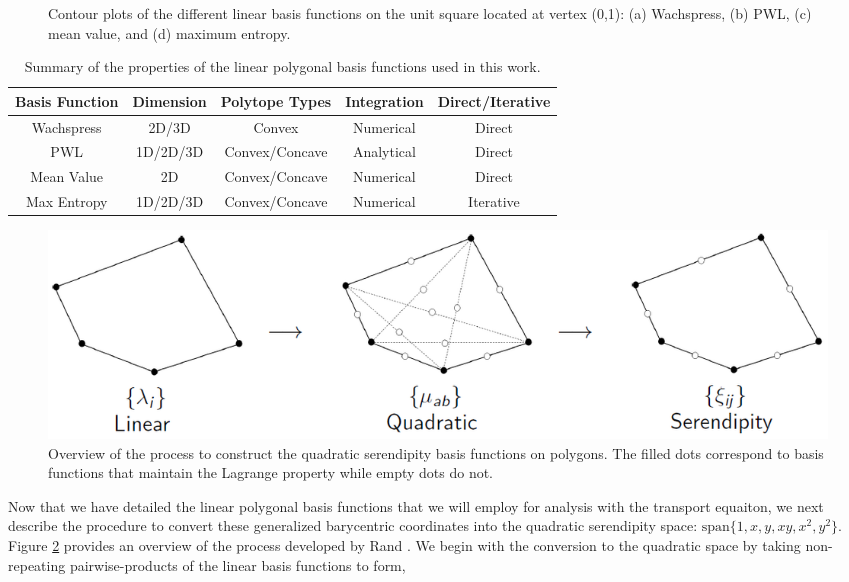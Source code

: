 \documentclass[11pt]{article}
\begin{document}
\begin{figure}
\begin{subfigure}[b]{0.225\textwidth}
		\caption{}
	\end{subfigure}
\caption{Contour plots of the different linear basis functions on the unit square located at vertex (0,1): (a) Wachspress, (b) PWL, (c) mean value, and (d) maximum entropy.}
\label{fig::2D_Linear_Summary_unit_square_basis_functions}
\end{figure}

\begin{table}
\caption{Summary of the properties of the linear polygonal basis functions used in this work.}
\centering
\begin{tabular}{|c|c|c|c|c|}
\hline
Basis Function & Dimension & Polytope Types & Integration & Direct/Iterative \\
\hline \hline
Wachspress	&2D/3D& Convex&	Numerical &Direct\\ \hline
PWL&	1D/2D/3D& Convex/Concave& Analytical &Direct\\ \hline
Mean Value&	2D& Convex/Concave& Numerical &Direct\\ \hline
Max Entropy& 1D/2D/3D &Convex/Concave& Numerical& Iterative\\ \hline
\end{tabular}
\label{tab::lin_poly_summary}
\end{table}

\begin{figure}
\centering
\includegraphics[width=\textwidth]{figures/linear_to_quad_process.png}
\caption{Overview of the process to construct the quadratic serendipity basis functions on polygons. The filled dots correspond to basis functions that maintain the Lagrange property while empty dots do not.}
\label{fig::lin_to_quad_process}
\end{figure}

Now that we have detailed the linear polygonal basis functions that we will employ for analysis with the transport equaiton, we next describe the procedure to convert these generalized barycentric coordinates into the quadratic serendipity space: $\text{span} \{   1,x,y,xy,x^2,y^2 \}$. Figure \ref{fig::lin_to_quad_process} provides an overview of the process developed by Rand \cite{rand2013interpolation}. We begin with the conversion to the quadratic space by taking non-repeating pairwise-products of the linear basis functions to form,
\end{document}
